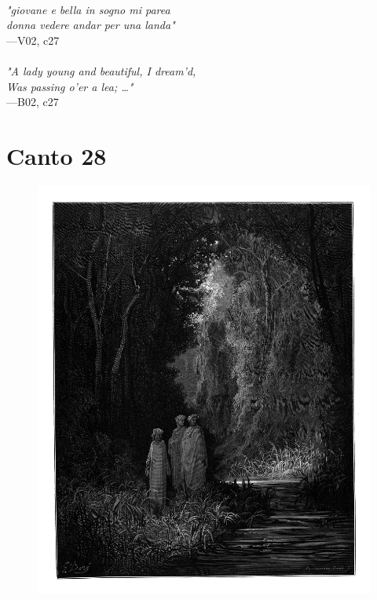 \documentclass[../Dore_vision.tex]{subfiles}
\begin{document}
\begin{center}
\begin{minipage}{0.8\linewidth}
\textit{\\
"giovane e bella in sogno mi parea\\donna vedere andar per una landa"} \\
—V02, c27 \\~\\
\textit{"A lady young and beautiful, I dream'd,\\Was passing o'er a lea; …"} \\
—B02, c27
\end{minipage}
\end{center}

\newpage

\section{Canto 28}

\begin{figure}[ht]
\centering
\includegraphics[height=\figsize]{illustrations/book_2/V02, c28.jpg}
\end{figure}
\end{document}
